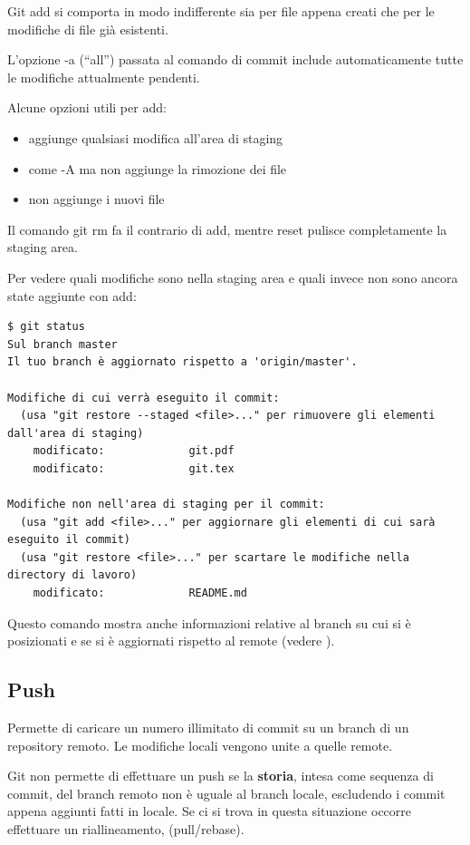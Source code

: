 \documentclass{article}
\begin{document}
Git add si comporta in modo indifferente sia per file appena creati che per le
modifiche di file già esistenti.

L'opzione -a (``all'') passata al comando di commit include automaticamente tutte
le modifiche attualmente pendenti.

Alcune opzioni utili per add:

\begin{itemize}
    \item {} aggiunge qualsiasi modifica all'area di staging
    \item {} come -A ma non aggiunge la rimozione dei file
    \item {} non aggiunge i nuovi file
\end{itemize}

Il comando git rm fa il contrario di add, mentre reset pulisce completamente la
staging area.

Per vedere quali modifiche sono nella staging area e quali invece non sono
ancora state aggiunte con add:

\begin{verbatim}
$ git status
Sul branch master
Il tuo branch è aggiornato rispetto a 'origin/master'.

Modifiche di cui verrà eseguito il commit:
  (usa "git restore --staged <file>..." per rimuovere gli elementi dall'area di staging)
	modificato:             git.pdf
	modificato:             git.tex

Modifiche non nell'area di staging per il commit:
  (usa "git add <file>..." per aggiornare gli elementi di cui sarà eseguito il commit)
  (usa "git restore <file>..." per scartare le modifiche nella directory di lavoro)
	modificato:             README.md
\end{verbatim}

Questo comando mostra anche informazioni relative al branch su cui si è
posizionati e se si è aggiornati rispetto al remote (vedere ).

\subsection{Push\label{push}}
Permette di caricare un numero illimitato di commit su un branch di un
repository remoto. Le modifiche locali vengono unite a quelle remote.

Git non permette di effettuare un push se la \textbf{storia}, intesa come sequenza di commit,
del branch remoto non è uguale al branch locale, escludendo i commit
appena aggiunti fatti in locale. Se ci si trova in questa situazione occorre effettuare un riallineamento,
(pull/rebase).
\end{document}

